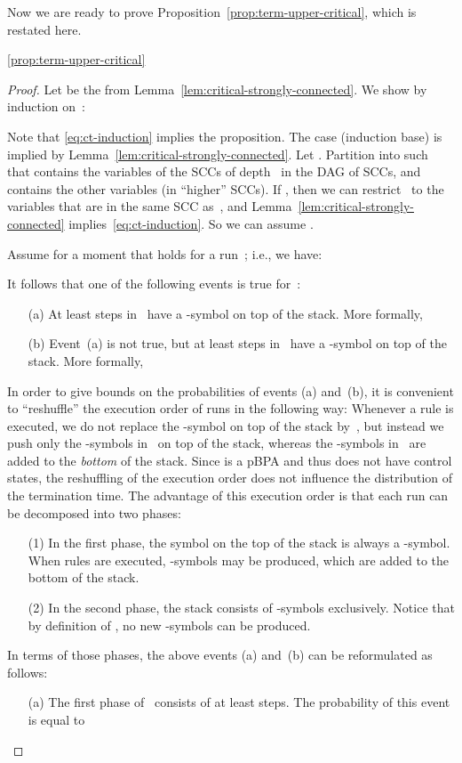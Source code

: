 \newcommand{\GammaH}{\Gamma_{\it high}}
\newcommand{\GammaL}{\Gamma_{\it low}}
\newcommand{\DeltaH}{\Delta_{\it high}}
\newcommand{\DeltaL}{\Delta_{\it low}}
Now we are ready to prove Proposition~\ref{prop:term-upper-critical}, which is restated here.
\begin{qproposition}{\ref{prop:term-upper-critical}}
 \stmtproptermuppercritical
\end{qproposition}
\begin{proof}
 Let  be the  from Lemma~\ref{lem:critical-strongly-connected}.
 We show by induction on~:
 
 Note that \eqref{eq:ct-induction} implies the proposition.
 The case  (induction base) is implied by Lemma~\ref{lem:critical-strongly-connected}.
 Let .
 Partition  into  such that 
  contains the variables of the SCCs of depth~ in the DAG of SCCs,
  and  contains the other variables (in ``higher'' SCCs).
 If , then we can restrict~ to the variables that are in the same SCC as~,
  and Lemma~\ref{lem:critical-strongly-connected} implies~\eqref{eq:ct-induction}.
 So we can assume .

 Assume for a moment that  holds for a run~;
  i.e., we have:
 
 It follows that one of the following events is true for~:
 \begin{itemize}
  \item[(a)]
   At least  steps in~ have a -symbol on top of the stack.
   More formally,
    
  \item[(b)]
   Event~(a) is not true, but at least  steps in~ have a -symbol on top of the stack.
   More formally,
    
 \end{itemize}
 In order to give bounds on the probabilities of events (a) and~(b),
  it is convenient to ``reshuffle'' the execution order of runs in the following way:
 Whenever a rule  is executed, we do not replace the -symbol on top of the stack by~,
  but instead we push only the -symbols in~ on top of the stack, whereas the -symbols in~
  are added to the {\em bottom} of the stack.
 Since  is a pBPA and thus does not have control states,
  the reshuffling of the execution order does not influence the distribution of the termination time.
 The advantage of this execution order is that each run can be decomposed into two phases:
 \begin{itemize}
  \item[(1)]
   In the first phase, the symbol on the top of the stack is always a -symbol.
   When rules are executed, -symbols may be produced, which are added to the bottom of the stack.
  \item[(2)]
   In the second phase, the stack consists of -symbols exclusively.
   Notice that by definition of , no new -symbols can be produced.
 \end{itemize}
 In terms of those phases, the above events (a) and~(b) can be reformulated as follows:
 \begin{itemize}
  \item[(a)]
   The first phase of~ consists of at least  steps.
   The probability of this event is equal to
    

\end{itemize}
\end{proof}
